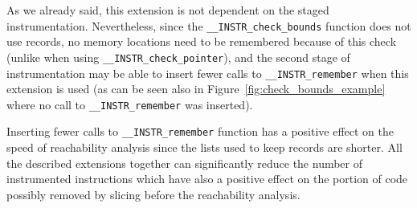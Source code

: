 As we already said, this extension is not dependent on the staged
instrumentation.  Nevertheless, since the
\texttt{\_\_INSTR\_check\_bounds} function does not use records, no
memory locations need to be remembered because of this check (unlike
when using \texttt{\_\_INSTR\_check\_pointer}), and the second stage
of instrumentation may be able to insert fewer calls to
\texttt{\_\_INSTR\_remember} when this extension is used (as can be
seen also in Figure~\ref{fig:check_bounds_example} where no call to
\texttt{\_\_INSTR\_remember} was inserted).

\medskip
Inserting fewer calls to \texttt{\_\_INSTR\_remember} function has
a positive effect on the speed of reachability analysis since the lists
used to keep records are shorter. All the described extensions together
can significantly reduce the number of instrumented instructions
which have also a positive effect on the portion of code possibly
removed by slicing before the reachability analysis.




